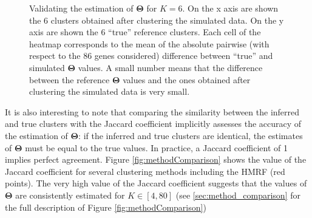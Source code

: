 \begin{figure}[bth]
        \myfloatalign
         \quad
        \caption{Validating the estimation of $\boldsymbol{\Theta}$ for $K=6$. On the x axis are shown the 6 clusters obtained after clustering the simulated data. On the y axis are shown the 6 ``true'' reference clusters. Each cell of the heatmap corresponds to the mean of the absolute pairwise (with respect to the 86 genes considered) difference between ``true'' and simulated $\boldsymbol{\Theta}$ values. A small number means that the difference between the reference $\boldsymbol{\Theta}$ values and the ones obtained after clustering the simulated data is very small.}\label{fig:theta_valid}
\end{figure}
	
	It is also interesting to note that comparing the similarity between the inferred and true clusters with the Jaccard coefficient implicitly assesses the accuracy of the estimation of $\boldsymbol{\Theta}$: if the inferred and true clusters are identical, the estimates of $\boldsymbol{\Theta}$ must be equal to the true values. In practice, a Jaccard coefficient of 1 implies perfect agreement. Figure \ref{fig:methodComparison} shows the value of the Jaccard coefficient for several clustering methods including the HMRF (red points). The very high value of the Jaccard coefficient suggests that the values of $\boldsymbol{\Theta}$ are consistently estimated for $K \in [4,80]$ (see \ref{sec:method_comparison} for the full description of Figure \ref{fig:methodComparison})\\
	

